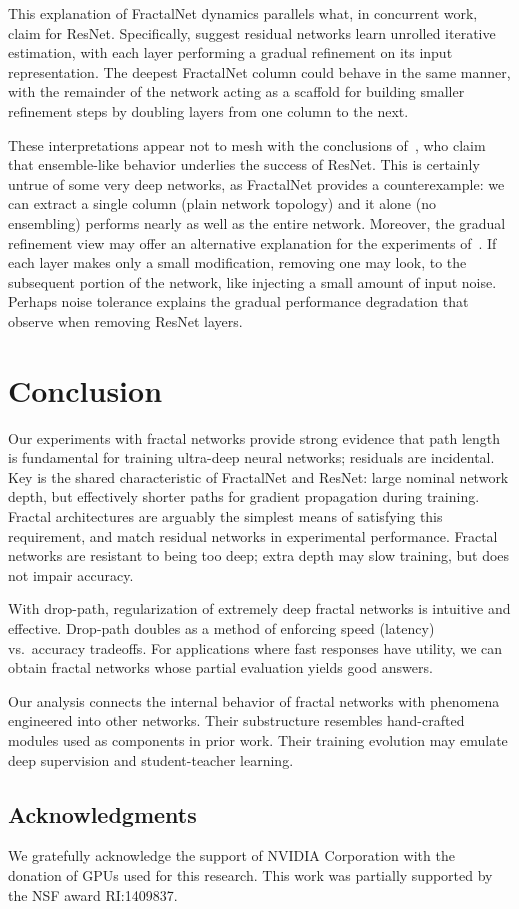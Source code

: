 \documentclass{article}
\newcommand{\fracnet}{FractalNet}
\newcommand{\resnet}{ResNet}
\newcommand{\droppath}{drop-path}
\newcommand{\Droppath}{Drop-path}
\begin{document}
This explanation of FractalNet dynamics parallels what, in concurrent
work, \cite{unrolled} claim for ResNet.  Specifically, \cite{unrolled} suggest
residual networks learn unrolled iterative estimation, with each layer
performing a gradual refinement on its input representation.  The deepest
FractalNet column could behave in the same manner, with the remainder of the
network acting as a scaffold for building smaller refinement steps by doubling
layers from one column to the next.

These interpretations appear not to mesh with the conclusions of~\cite{
veit16residual}, who claim that ensemble-like behavior underlies the success of
ResNet.  This is certainly untrue of some very deep networks, as FractalNet
provides a counterexample: we can extract a single column (plain network
topology) and it alone (no ensembling) performs nearly as well as the entire
network.  Moreover, the gradual refinement view may offer an alternative
explanation for the experiments of~\cite{veit16residual}.  If each layer makes
only a small modification, removing one may look, to the subsequent portion of
the network, like injecting a small amount of input noise.  Perhaps noise
tolerance explains the gradual performance degradation that \cite{
veit16residual} observe when removing ResNet layers.
 
\section{Conclusion}
\label{sec:discussion}
Our experiments with fractal networks provide strong evidence that path length
is fundamental for training ultra-deep neural networks; residuals are
incidental.  Key is the shared characteristic of {\fracnet} and {\resnet}:
large nominal network depth, but effectively shorter paths for gradient
propagation during training.  Fractal architectures are arguably the simplest
means of satisfying this requirement, and match residual networks
in experimental performance.  Fractal networks are resistant to being too deep;
extra depth may slow training, but does not impair accuracy.

With {\droppath}, regularization of extremely deep fractal networks is
intuitive and effective.  {\Droppath} doubles as a method of enforcing speed
(latency) vs.~accuracy tradeoffs.  For applications where fast responses have
utility, we can obtain fractal networks whose partial evaluation yields good
answers.

Our analysis connects the internal behavior of fractal networks with phenomena
engineered into other networks.  Their substructure resembles hand-crafted
modules used as components in prior work.  Their training evolution may emulate
deep supervision and student-teacher learning.
 
\subsection*{Acknowledgments}
We gratefully acknowledge the support of NVIDIA Corporation with the donation
of GPUs used for this research.  This work was partially supported by the NSF
award RI:1409837.

{\small


}
\end{document}

